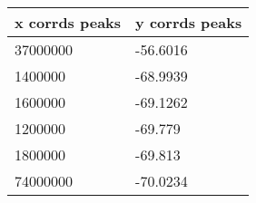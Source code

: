 \begin{tabular}{ll}
x corrds peaks & y corrds peaks \\ 
\hline 
37000000 & -56.6016 \\ 
1400000 & -68.9939 \\ 
1600000 & -69.1262 \\ 
1200000 & -69.779 \\ 
1800000 & -69.813 \\ 
74000000 & -70.0234 \\ 
\hline 
\end{tabular}